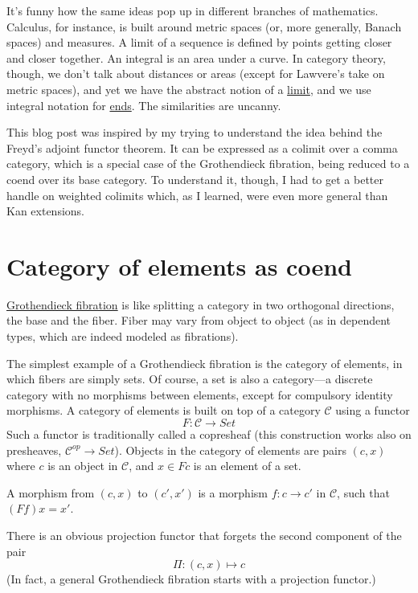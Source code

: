 \documentclass[11pt]{amsart}
\begin{document}
It's funny how the same ideas pop up in different branches of mathematics. Calculus, for instance, is built around metric spaces (or, more generally, Banach spaces) and measures. A limit of a sequence is defined by points getting closer and closer together. An integral is an area under a curve. In category theory, though, we don't talk about distances or areas (except for Lawvere's take on metric spaces), and yet we have the abstract notion of a \href{https://bartoszmilewski.com/2015/04/15/limits-and-colimits/}{limit}, and we use integral notation for \href{https://bartoszmilewski.com/2017/03/29/ends-and-coends/}{ends}. The similarities are uncanny. 

This blog post was inspired by my trying to understand the idea behind the Freyd's adjoint functor theorem. It can be expressed as a colimit over a comma category, which is a special case of the Grothendieck fibration, being reduced to a coend over its base category. To understand it, though, I had to get a better handle on weighted colimits which, as I learned, were even more general than Kan extensions. 

\section{Category of elements as coend}

\href{https://bartoszmilewski.com/2019/10/09/fibrations-cleavages-and-lenses/}{Grothendieck fibration} is like splitting a category in two orthogonal directions, the base and the fiber. Fiber may vary from object to object (as in dependent types, which are indeed modeled as fibrations). 

The simplest example of a Grothendieck fibration is the category of elements, in which fibers are simply sets. Of course, a set is also a category---a discrete category with no morphisms between elements, except for compulsory identity morphisms. A category of elements is built on top of a category $\mathcal{C}$ using a functor
\[F \colon \mathcal{C} \to Set\]
Such a functor is traditionally called a copresheaf (this construction works also on presheaves, $\mathcal{C}^{op} \to Set$). Objects in the category of elements are pairs $(c, x)$ where $c$ is an object in $\mathcal{C}$, and $x \in F c$ is an element of a set. 

A morphism from $(c, x)$ to $(c', x')$ is a morphism  $f \colon c \to c'$ in $\mathcal{C}$, such that $(F f) x = x'$.

There is an obvious projection functor that forgets the second component of the pair
\[\Pi \colon (c, x) \mapsto c\]
(In fact, a general Grothendieck fibration starts with a projection functor.)
\end{document}
